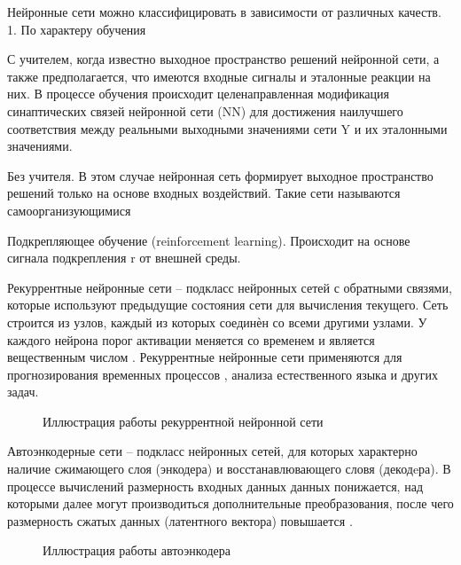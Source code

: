 Нейронные сети можно классифицировать в зависимости от различных качеств.
1. По характеру обучения

С учителем, когда известно выходное пространство решений нейронной сети, а также предполагается, что имеются входные сигналы и
эталонные реакции на них. В процессе обучения происходит целенаправленная модификация синаптических связей нейронной сети (NN)
для достижения наилучшего соответствия между реальными выходными значениями сети Y и их эталонными значениями.

Без учителя. В этом случае нейронная сеть формирует выходное
пространство решений только на основе входных воздействий. Такие
сети называются самоорганизующимися

Подкрепляющее обучение (reinforcement learning). Происходит на основе сигнала подкрепления r от внешней среды.

Рекуррентные нейронные сети -- подкласс нейронных сетей с обратными связями, которые
используют предыдущие состояния сети для вычисления текущего. Сеть строится из узлов, каждый
из которых соединѐн со всеми другими узлами. У каждого нейрона порог активации меняется со
временем и является вещественным числом \cite{bguir_rnn}. 
Рекуррентные нейронные сети применяются для прогнозирования временных процессов \cite{bgu_krasn}, анализа естественного языка и других задач.
\begin{figure}[H]
	\caption{Иллюстрация работы рекуррентной нейронной сети}
\end{figure}

Автоэнкодерные сети -- подкласс нейронных сетей, для которых характерно наличие сжимающего слоя (энкодера) и восстанавлювающего словя (декодeра).
В процессе вычислений размерность входных данных данных понижается, над которыми далее могут производиться дополнительные преобразования, 
после чего размерность сжатых данных (латентного вектора) повышается \cite{vae}.
\begin{figure}[H]
	\caption{Иллюстрация работы автоэнкодера}
\end{figure}

